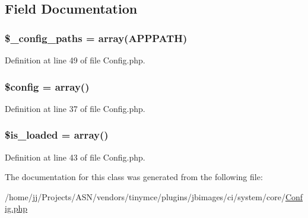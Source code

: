 \subsection{Field Documentation}
\subsubsection[{\texorpdfstring{\$\+\_\+config\+\_\+paths}{$_config_paths}}]{\setlength{\rightskip}{0pt plus 5cm}\$\+\_\+config\+\_\+paths = array(A\+P\+P\+P\+A\+TH)}\hypertarget{class_c_i___config_a5f47dbd2111b5bb6c91ece69fefebf26}{}\label{class_c_i___config_a5f47dbd2111b5bb6c91ece69fefebf26}


Definition at line 49 of file Config.\+php.

\subsubsection[{\texorpdfstring{\$config}{$config}}]{\setlength{\rightskip}{0pt plus 5cm}\$config = array()}\hypertarget{class_c_i___config_a49c7011be9c979d9174c52a8b83e5d8e}{}\label{class_c_i___config_a49c7011be9c979d9174c52a8b83e5d8e}


Definition at line 37 of file Config.\+php.

\subsubsection[{\texorpdfstring{\$is\+\_\+loaded}{$is_loaded}}]{\setlength{\rightskip}{0pt plus 5cm}\$is\+\_\+loaded = array()}\hypertarget{class_c_i___config_a908e9ad52a5d1956d360689452f6bdbe}{}\label{class_c_i___config_a908e9ad52a5d1956d360689452f6bdbe}


Definition at line 43 of file Config.\+php.



The documentation for this class was generated from the following file\+:\begin{DoxyCompactItemize}
\item 
/home/jj/\+Projects/\+A\+S\+N/vendors/tinymce/plugins/jbimages/ci/system/core/\hyperlink{_config_8php}{Config.\+php}\end{DoxyCompactItemize}
